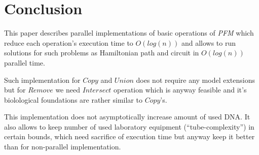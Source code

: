\section{Conclusion}\label{conclusion}
This paper describes parallel implementations of basic operations of \emph{PFM} which reduce each operation's execution time to $O(log(n))$ and allows to run solutions for such problems as Hamiltonian path and circuit in $O(log(n))$ parallel time.

Such implementation for $Copy$ and $Union$ does not require any model extensions but for $Remove$ we need $Intersect$ operation which is anyway feasible and it's biolological foundations are rather similar to $Copy$'s.

This implementation does not asymptotically increase amount of used DNA. It also allows to keep number of used laboratory equipment (``tube-complexity'') in certain bounds, which need sacrifice of execution time but anyway keep it better than for non-parallel implementation.